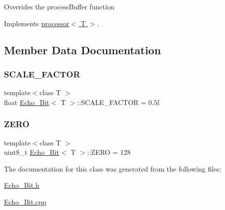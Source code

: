 Overrides the process\+Buffer function 

Implements \hyperlink{classprocessor_ab23d53c7dd927e50108272ee007dcc29}{processor$<$ T $>$}.



\subsection{Member Data Documentation}
\mbox{\label{classEcho__8Bit_a26bd2ba0910d1e4bb84357b6f83c776b}} 
\subsubsection{\texorpdfstring{S\+C\+A\+L\+E\+\_\+\+F\+A\+C\+T\+OR}{SCALE\_FACTOR}}
{\footnotesize\ttfamily template$<$class T $>$ \\
float \hyperlink{classEcho__8Bit}{Echo\+\_\+Bit}$<$ T $>$\+::S\+C\+A\+L\+E\+\_\+\+F\+A\+C\+T\+OR = 0.\+5f}

\mbox{\label{classEcho__8Bit_a2f1c64b678e48cc37f55739fd85e65b3}} 
\subsubsection{\texorpdfstring{Z\+E\+RO}{ZERO}}
{\footnotesize\ttfamily template$<$class T $>$ \\
uint8\+\_\+t \hyperlink{classEcho__8Bit}{Echo\+\_\+Bit}$<$ T $>$\+::Z\+E\+RO = 128}



The documentation for this class was generated from the following files\+:\begin{DoxyCompactItemize}
\item 
\hyperlink{Echo__8Bit_8h}{Echo\+\_\+Bit.\+h}\item 
\hyperlink{Echo__8Bit_8cpp}{Echo\+\_\+Bit.\+cpp}\end{DoxyCompactItemize}
